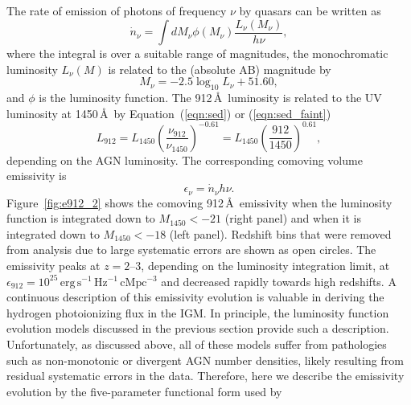 \documentclass[fleqn,usenatbib]{mnras}
\begin{document}
The rate of emission of photons of frequency $\nu$ by quasars can be
written as
\begin{equation}
  \dot n_\nu = \int dM_\nu \phi(M_\nu) \frac{L_\nu(M_\nu)}{h\nu},
\end{equation}
where the integral is over a suitable range of magnitudes, the
monochromatic luminosity $L_\nu(M)$ is related to the (absolute AB)
magnitude by \citep{1983ApJ...266..713O}
\begin{equation}
  M_\nu = -2.5\log_{10}L_\nu+51.60,
\end{equation}
and $\phi$ is the luminosity function.  The 912\,\AA\ luminosity is
related to the UV luminosity at 1450\,\AA\ by Equation~(\ref{eqn:sed})
or (\ref{eqn:sed_faint})
\begin{equation}
  L_{912}=L_{1450}\left(\frac{\nu_{912}}{\nu_{1450}}\right)^{-0.61}=L_{1450}\left(\frac{912}{1450}\right)^{0.61},
\end{equation}
depending on the AGN luminosity.  The corresponding comoving volume
emissivity is
\begin{equation}
  \epsilon_\nu = \dot n_\nu h\nu.
  \label{eqn:epsilon}
\end{equation}
Figure~\ref{fig:e912_2} shows the comoving 912\,\AA\ emissivity when
the luminosity function is integrated down to $M_{1450}<-21$ (right
panel) and when it is integrated down to $M_{1450}<-18$ (left panel).
Redshift bins that were removed from analysis due to large systematic
errors are shown as open circles.  The emissivity peaks at $z=2$--$3$,
depending on the luminosity integration limit, at
$\epsilon_{912}=10^{25}\,\mathrm{erg\, s^{-1}\, Hz^{-1}\, cMpc^{-3}}$
and decreased
rapidly towards high redshifts.  A continuous
description of this emissivity evolution is valuable in deriving the
hydrogen photoionizing flux in the IGM.  In principle, the luminosity
function evolution models discussed in the previous section provide
such a description.  Unfortunately, as discussed above, all of these
models suffer from pathologies such as non-monotonic or divergent
AGN
number densities, likely resulting from residual systematic errors in
the data.  Therefore, here we describe the emissivity evolution by the
five-parameter functional form used by \citet{2012ApJ...746..125H}
\end{document}
